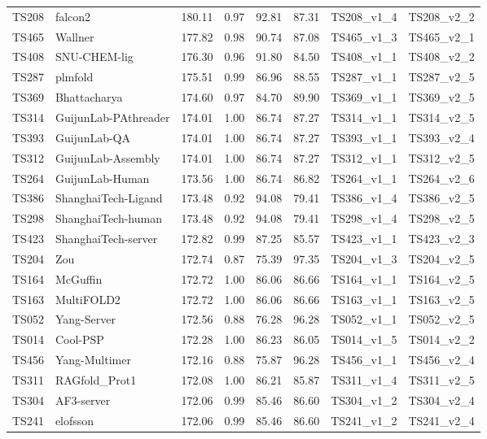 \begin{longtable}{llllllll}
TS208 & falcon2 & 180.11 & 0.97 & 92.81 & 87.31 & TS208\_v1\_4 & TS208\_v2\_2 \\ 
TS465 & Wallner & 177.82 & 0.98 & 90.74 & 87.08 & TS465\_v1\_3 & TS465\_v2\_1 \\ 
TS408 & SNU-CHEM-lig & 176.30 & 0.96 & 91.80 & 84.50 & TS408\_v1\_1 & TS408\_v2\_2 \\ 
TS287 & plmfold & 175.51 & 0.99 & 86.96 & 88.55 & TS287\_v1\_1 & TS287\_v2\_5 \\ 
TS369 & Bhattacharya & 174.60 & 0.97 & 84.70 & 89.90 & TS369\_v1\_1 & TS369\_v2\_5 \\ 
TS314 & GuijunLab-PAthreader & 174.01 & 1.00 & 86.74 & 87.27 & TS314\_v1\_1 & TS314\_v2\_5 \\ 
TS393 & GuijunLab-QA & 174.01 & 1.00 & 86.74 & 87.27 & TS393\_v1\_1 & TS393\_v2\_4 \\ 
TS312 & GuijunLab-Assembly & 174.01 & 1.00 & 86.74 & 87.27 & TS312\_v1\_1 & TS312\_v2\_5 \\ 
TS264 & GuijunLab-Human & 173.56 & 1.00 & 86.74 & 86.82 & TS264\_v1\_1 & TS264\_v2\_6 \\ 
TS386 & ShanghaiTech-Ligand & 173.48 & 0.92 & 94.08 & 79.41 & TS386\_v1\_4 & TS386\_v2\_5 \\ 
TS298 & ShanghaiTech-human & 173.48 & 0.92 & 94.08 & 79.41 & TS298\_v1\_4 & TS298\_v2\_5 \\ 
TS423 & ShanghaiTech-server & 172.82 & 0.99 & 87.25 & 85.57 & TS423\_v1\_1 & TS423\_v2\_3 \\ 
TS204 & Zou & 172.74 & 0.87 & 75.39 & 97.35 & TS204\_v1\_3 & TS204\_v2\_5 \\ 
TS164 & McGuffin & 172.72 & 1.00 & 86.06 & 86.66 & TS164\_v1\_1 & TS164\_v2\_5 \\ 
TS163 & MultiFOLD2 & 172.72 & 1.00 & 86.06 & 86.66 & TS163\_v1\_1 & TS163\_v2\_5 \\ 
TS052 & Yang-Server & 172.56 & 0.88 & 76.28 & 96.28 & TS052\_v1\_1 & TS052\_v2\_5 \\ 
TS014 & Cool-PSP & 172.28 & 1.00 & 86.23 & 86.05 & TS014\_v1\_5 & TS014\_v2\_2 \\ 
TS456 & Yang-Multimer & 172.16 & 0.88 & 75.87 & 96.28 & TS456\_v1\_1 & TS456\_v2\_4 \\ 
TS311 & RAGfold\_Prot1 & 172.08 & 1.00 & 86.21 & 85.87 & TS311\_v1\_4 & TS311\_v2\_5 \\ 
TS304 & AF3-server & 172.06 & 0.99 & 85.46 & 86.60 & TS304\_v1\_2 & TS304\_v2\_4 \\ 
TS241 & elofsson & 172.06 & 0.99 & 85.46 & 86.60 & TS241\_v1\_2 & TS241\_v2\_4 \\ 

\end{longtable}
